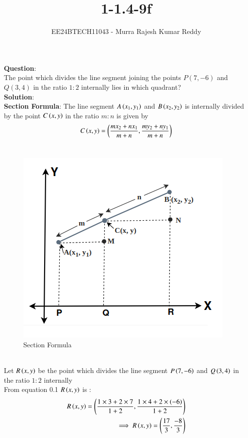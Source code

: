 \documentclass[journal]{IEEEtran}
\begin{document}

\vspace{3cm}

\title{1-1.4-9f}
\author{EE24BTECH11043 - Murra Rajesh Kumar Reddy}
{\let\newpage\relax\maketitle}

\renewcommand{\thefigure}{\theenumi}
\renewcommand{\thetable}{\theenumi}
\setlength{\intextsep}{10pt} %


\renewcommand{\thetable}{\theenumi}

\textbf{Question}:\\
The point which divides the line segment joining the points $P(7,-6)$ and $Q(3,4)$ in the ratio $1:2$ internally lies in which quadrant?
\\
\textbf{Solution}:
\\
\textbf{Section Formula}: The line segment $A\left(x_1,y_1\right)$ and $B\left(x_2,y_2\right)$ is internally divided by the point $C\left(x,y\right)$ in the ratio $m:n$ is given by
\\
\begin{align}
\centering
	C\brak{x,y} = \brak{\frac{mx_2+nx_1}{m+n},\frac{my_2+ny_1}{m+n}}
\end{align}
\\
\begin{figure}[h!]
	\centering
	\includegraphics[width=0.7\linewidth]{figs/fig_2.png}
	\caption{Section Formula}
	\label{Section Formula}
\end{figure}
\\
Let $R\left(x,y\right)$ be the point which divides the line segment $P\left(7,-6\right)$ and $Q\left(3,4\right)$ in the ratio $1:2$ internally 
\\
\newpage
From equation 0.1 $R\left(x,y\right)$ is :
\\
\begin{align}
	R\left(x,y\right) = \left(\frac{1\times3+2\times7}{1+2},\frac{1\times4+2\times\left(-6\right)}{1+2}\right)\\
	\implies R\left(x,y\right) = \left(\frac{17}{3},\frac{-8}{3}\right)
\end{align}
\end{document}
